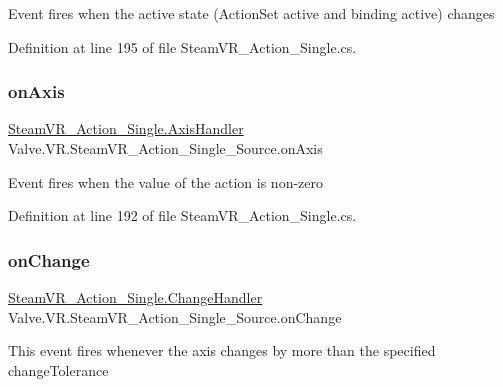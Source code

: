 Event fires when the active state (Action\+Set active and binding active) changes 



Definition at line 195 of file Steam\+V\+R\+\_\+\+Action\+\_\+\+Single.\+cs.

\mbox{\label{class_valve_1_1_v_r_1_1_steam_v_r___action___single___source_a023859c2a275b8f88920f706688fd26b}} 
\subsubsection{\texorpdfstring{onAxis}{onAxis}}
{\footnotesize\ttfamily \mbox{\hyperlink{class_valve_1_1_v_r_1_1_steam_v_r___action___single_a4193937cd6b6e4b7248374bc5636f6fd}{Steam\+V\+R\+\_\+\+Action\+\_\+\+Single.\+Axis\+Handler}} Valve.\+V\+R.\+Steam\+V\+R\+\_\+\+Action\+\_\+\+Single\+\_\+\+Source.\+on\+Axis}



Event fires when the value of the action is non-\/zero 



Definition at line 192 of file Steam\+V\+R\+\_\+\+Action\+\_\+\+Single.\+cs.

\mbox{\label{class_valve_1_1_v_r_1_1_steam_v_r___action___single___source_ac4dc468da3b5947b1e368fd124683c61}} 
\subsubsection{\texorpdfstring{onChange}{onChange}}
{\footnotesize\ttfamily \mbox{\hyperlink{class_valve_1_1_v_r_1_1_steam_v_r___action___single_ae0c72c83dccd88a0235e8a831d62116e}{Steam\+V\+R\+\_\+\+Action\+\_\+\+Single.\+Change\+Handler}} Valve.\+V\+R.\+Steam\+V\+R\+\_\+\+Action\+\_\+\+Single\+\_\+\+Source.\+on\+Change}



This event fires whenever the axis changes by more than the specified change\+Tolerance 



